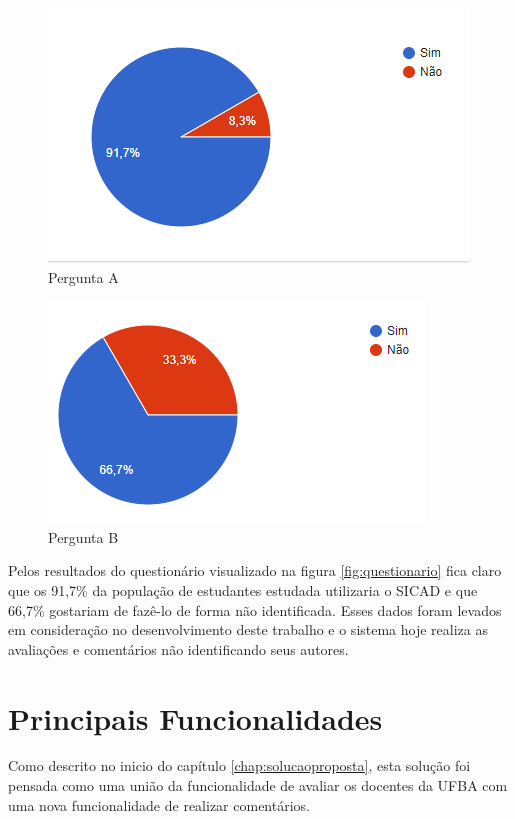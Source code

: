 \documentclass[12pt, a4paper]{report}
\begin{document}
\begin{figure}
\centering
\includegraphics[scale=0.8]{pergunta_a.png}
\caption{Pergunta A}
\label{fig:pergunta_a}
\end{figure}


\begin{figure}
\centering
\includegraphics[scale=0.8]{pergunta_b}
\caption{Pergunta B}
\label{fig:pergunta_b}
\end{figure}



Pelos resultados do questionário visualizado na figura \ref{fig:questionario} fica claro que os 91,7\% da população de estudantes estudada utilizaria o SICAD e que 66,7\% gostariam de fazê-lo de forma não identificada. Esses dados foram levados em consideração no desenvolvimento deste trabalho e o sistema hoje realiza as avaliações e comentários não identificando seus autores.


\section{ Principais Funcionalidades}

Como descrito no inicio do capítulo \ref{chap:solucaoproposta}, esta solução foi pensada como uma união da funcionalidade de avaliar os docentes da UFBA com uma nova funcionalidade de realizar comentários.
\end{document}
